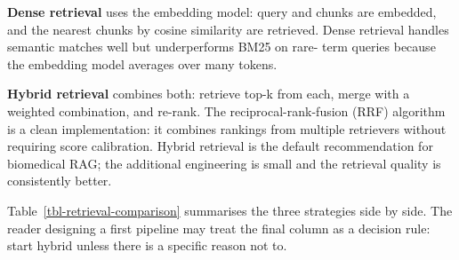 \documentclass[
  letterpaper,
  11pt]{scrbook}
\begin{document}
\textbf{Dense retrieval} uses the embedding model: query and chunks are
embedded, and the nearest chunks by cosine similarity are retrieved.
Dense retrieval handles semantic matches well but underperforms BM25 on
rare- term queries because the embedding model averages over many
tokens.

\textbf{Hybrid retrieval} combines both: retrieve top-k from each, merge
with a weighted combination, and re-rank. The reciprocal-rank-fusion
(RRF) algorithm is a clean implementation: it combines rankings from
multiple retrievers without requiring score calibration. Hybrid
retrieval is the default recommendation for biomedical RAG; the
additional engineering is small and the retrieval quality is
consistently better.

Table~\ref{tbl-retrieval-comparison} summarises the three strategies
side by side. The reader designing a first pipeline may treat the final
column as a decision rule: start hybrid unless there is a specific
reason not to.
\end{document}
